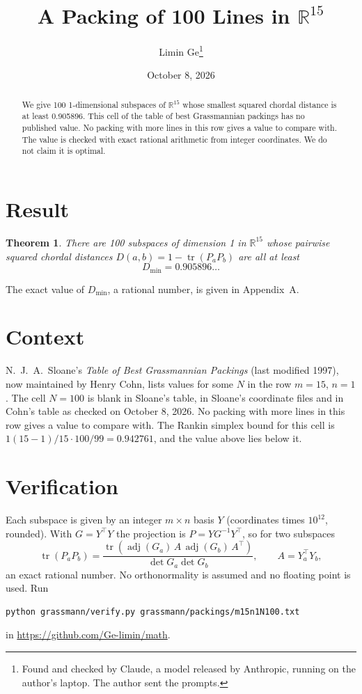 \documentclass[11pt,a4paper]{article}
\title{A Packing of 100 Lines in $\mathbb{R}^{15}$}
\author{Limin Ge\thanks{Found and checked by Claude, a model released by Anthropic, running on the author's laptop. The author sent the prompts.}}
\date{October 8, 2026}
\newtheorem*{theorem}{Theorem}
\begin{document}
\maketitle
\begin{abstract}
We give 100 1-dimensional subspaces of $\mathbb{R}^{15}$ whose smallest squared chordal distance is at least 0.905896. This cell of the table of best Grassmannian packings has no published value. No packing with more lines in this row gives a value to compare with. The value is checked with exact rational arithmetic from integer coordinates. We do not claim it is optimal.
\end{abstract}

\section{Result}
\begin{theorem}
There are 100 subspaces of dimension 1 in $\mathbb{R}^{15}$ whose pairwise squared chordal distances $D(a,b) = 1 - \operatorname{tr}(P_aP_b)$ are all at least
\[ D_{\min} = 0.905896\ldots \]
\end{theorem}
The exact value of $D_{\min}$, a rational number, is given in Appendix~A.


\section{Context}
N.~J.~A.~Sloane's \emph{Table of Best Grassmannian Packings} (last modified 1997), now maintained by Henry Cohn, lists values for some $N$ in the row $m=15$, $n=1$. The cell $N=100$ is blank in Sloane's table, in Sloane's coordinate files and in Cohn's table as checked on October 8, 2026. No packing with more lines in this row gives a value to compare with. The Rankin simplex bound for this cell is $1(15-1)/15\cdot 100/99 = 0.942761$, and the value above lies below it.


\section{Verification}
Each subspace is given by an integer $m\times n$ basis $Y$ (coordinates times $10^{12}$, rounded). With $G=Y^\top Y$ the projection is $P=YG^{-1}Y^\top$, so for two subspaces
\[ \operatorname{tr}(P_aP_b)=\frac{\operatorname{tr}(\operatorname{adj}(G_a)\,A\,\operatorname{adj}(G_b)\,A^\top)}{\det G_a\det G_b},\qquad A=Y_a^\top Y_b, \]
an exact rational number. No orthonormality is assumed and no floating point is used. Run
\begin{verbatim}
python grassmann/verify.py grassmann/packings/m15n1N100.txt
\end{verbatim}
in \url{https://github.com/Ge-limin/math}.
\end{document}
